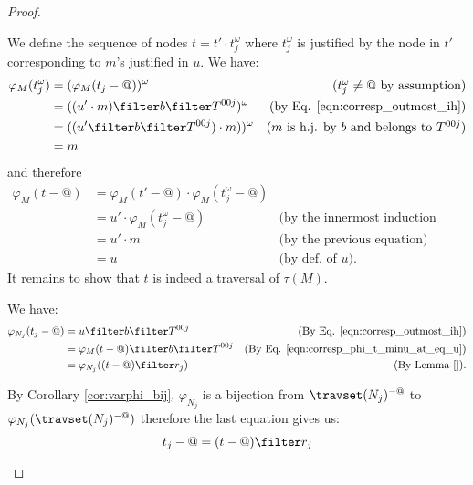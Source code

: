 \begin{proof}
\begin{enumerate}[$\bullet$]
\begin{enumerate}
\begin{enumerate}[-]
        We define the sequence of nodes $t = t'\cdot t_j^\omega$
        where $t_j^\omega$ is justified by the node in $t'$ corresponding
        to $m$'s justified in $u$. We have:
        \begin{align*}
            \varphi_M (t_j^\omega) &= (\varphi_M (t_j-@))^\omega & \mbox{($t_j^\omega \neq @$ by assumption)}\\
                                   &= ((u' \cdot m) \filter b\filter T^{00j})^\omega & \mbox{(by Eq. \ref{eqn:corresp_outmost_ih})}\\
                                   &= ((u' \filter b\filter T^{00j}) \cdot m))^\omega & \mbox{($m$ is h.j. by $b$ and belongs to $T^{00j}$)}\\
                                   &= m
        \end{align*}
        and therefore
        \begin{align}
          \varphi_{M}(t-@)  &=  \varphi_{M}(t'-@)  \cdot \varphi_{M}(t_j^\omega-@) \nonumber \\
                &=   u' \cdot \varphi_{M}(t_j^\omega-@) & \mbox{(by the innermost induction hypothesis)} \nonumber \\
                &=   u' \cdot m & \mbox{(by the previous equation)} \nonumber \\
                &=   u & \mbox{(by def. of $u$).} \label{eqn:corresp_phi_t_minu_at_eq_u}
        \end{align}
        It remains to show that $t$ is indeed a traversal of $\tau(M)$.

        We have:
        \begin{align*}
        \varphi_{N_j}(t_j-@) &= u \filter b \filter T^{00j}
            & \mbox{(By Eq. \ref{eqn:corresp_outmost_ih})} \\
         &= \varphi_{M}(t-@) \filter b \filter T^{00j}
            & \mbox{(By Eq. \ref{eqn:corresp_phi_t_minu_at_eq_u})} \\
         &= \varphi_{N_j}((t-@) \filter r_j )
            & \mbox{(By Lemma \ref{}).}
        \end{align*}

        By Corollary \ref{cor:varphi_bij}, $\varphi_{N_j}$ is a bijection from $\travset(N_j)^{-@}$ to
        $\varphi_{N_j}( \travset(N_j)^{-@})$ therefore the last equation gives us:
         $$t_j-@ = (t-@) \filter r_j $$


\end{enumerate}
\end{enumerate}
\end{enumerate}
\end{proof}
